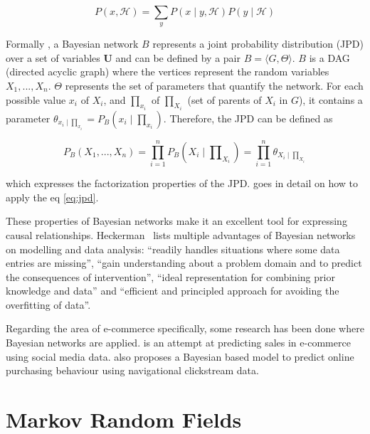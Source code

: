 \begin{equation}
P(x, \mathcal{H}) = \sum_{y}^{} P(x \mid y, \mathcal{H}) P(y \mid \mathcal{H}) 
\label{eq:sum}
\end{equation}

Formally \cite{Pearl:1988:PRI:534975}, a Bayesian network $ B $ represents a 
joint probability distribution (JPD) over a set of variables $ \mathbf{U}$ and 
can be defined by a pair $ B = \langle G, \Theta \rangle $. $ B $ is a DAG 
(directed acyclic graph) where the vertices represent the random variables $ 
X_{1}, ..., X_{n} $. $ \Theta $ represents the set of parameters that quantify 
the network. For each possible value $ x_{i} $ of $ X_{i} $, and $ 
\prod_{x_{i}} $ of $ \prod_{X_{i}} $ (set of parents of $ X_{i} $ in $ G $), it 
contains a parameter $ \theta_{x_{i} \mid \prod_{x_{i}}} = P_{B}(x_{i} \mid 
\prod_{x_{i}}) $. Therefore, the JPD can be defined as

\begin{equation}
P_{B}(X_{1}, ..., X_{n}) = \prod_{i=1}^{n} P_{B}(X_{i} \mid 
\prod\nolimits_{X_{i}}) =
\prod_{i=1}^{n} \theta_{X_{i} \mid \prod_{X_{i}}} \label{eq:jpd}
\end{equation}

which expresses the factorization properties of the JPD. \cite[section 
8.1.]{bishop2006pattern} goes in detail on how to apply the eq \ref{eq:jpd}.

These properties of Bayesian networks make it an excellent tool for expressing 
causal relationships. Heckerman~\cite{Heckerman1996} lists multiple advantages 
of Bayesian networks on modelling and data analysis: ``readily handles 
situations where some data entries are missing'', ``gain understanding about a 
problem domain and to predict the consequences of intervention'', ``ideal 
representation for combining prior knowledge and data'' and ``efficient and 
principled approach for avoiding the overfitting of data''.

Regarding the area of e-commerce specifically, some research has been done 
where Bayesian networks are applied. \cite{Nasambu2014} is an attempt at 
predicting sales in e-commerce using social media data. \cite{Moe2002} also 
proposes a Bayesian based model to predict online purchasing behaviour using 
navigational clickstream data.

\section{Markov Random Fields}

